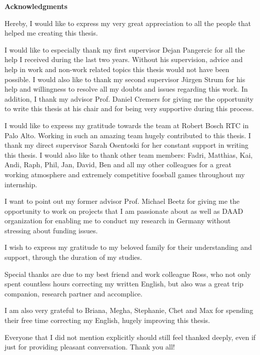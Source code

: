 \clearemptydoublepage
{}
{}	

\vspace*{1cm}
\begin{center}
{\Large \bf Acknowledgments}
\end{center}
\vspace{1cm}

Hereby, I would like to express my very great appreciation to all the people that helped me creating this thesis.

I would like to especially thank my first supervisor Dejan Pangercic for all the help I received during the last two years. Without his supervision, advice and help in work and non-work related topics this thesis would not have been possible. I would also like to thank my second supervisor J{\"u}rgen Strum for his help and willingness to resolve all my doubts and issues regarding this work. In addition, I thank my advisor Prof. Daniel Cremers for giving me the opportunity to write this thesis at his chair and for being very supportive during this process.

I would like to express my gratitude towards the team at Robert Bosch RTC in Palo Alto. Working in such an amazing team hugely contributed to this thesis. I thank my direct supervisor Sarah Osentoski for her constant support in writing this thesis. I would also like to thank other team members: Fadri, Matthias, Kai, Andi, Raph, Phil, Jan, David, Ben and all my other colleagues for a great working atmosphere and extremely competitive foosball games throughout my internship.

I want to point out my former advisor Prof. Michael Beetz for giving me the opportunity to work on projects that I am passionate about as well as DAAD organization for enabling me to conduct my research in Germany without stressing about funding issues.

I wish to express my gratitude to my beloved family for their understanding and support, through the duration of my studies.

Special thanks are due to my best friend and work colleague Ross, who not only spent countless hours correcting my written English, but also was a great trip companion, research partner and accomplice.

I am also very grateful to Briana, Megha, Stephanie, Chet and Max for spending their free time correcting my English, hugely improving this thesis. 


Everyone that I did not mention explicitly should still feel thanked deeply, even if
just for providing pleasant conversation.
Thank you all!

